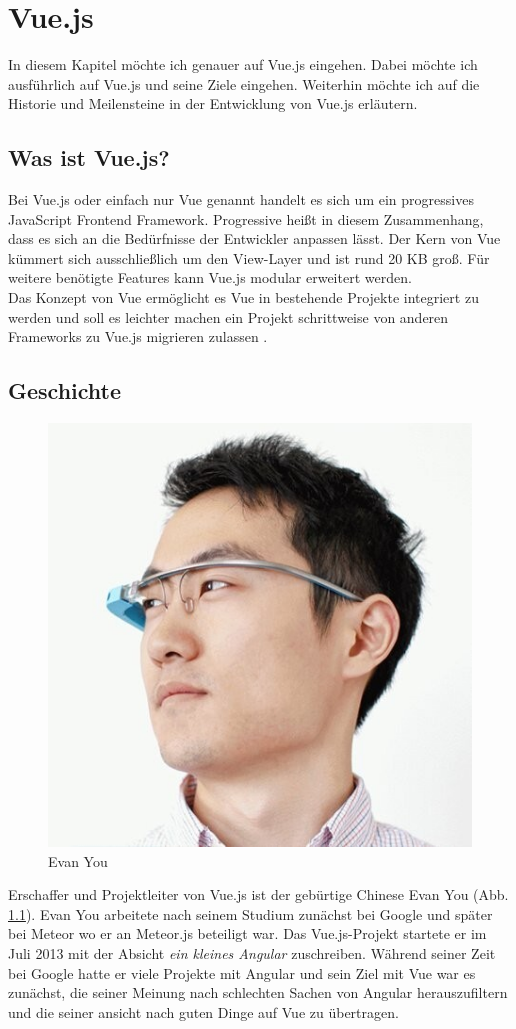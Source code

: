 
\chapter{Vue.js}
In diesem Kapitel möchte ich genauer auf Vue.js eingehen.
Dabei möchte ich ausführlich auf Vue.js und seine Ziele eingehen.
Weiterhin möchte ich auf die Historie und Meilensteine in der Entwicklung von Vue.js erläutern.


\section{Was ist Vue.js?}
Bei Vue.js oder einfach nur Vue genannt handelt es sich um ein progressives JavaScript Frontend Framework.
Progressive heißt in diesem Zusammenhang,
dass es sich an die Bedürfnisse der Entwickler anpassen lässt.
Der Kern von Vue kümmert sich ausschließlich um den View-Layer und ist rund 20 KB groß.
Für weitere benötigte Features kann Vue.js modular erweitert werden. \cite[S. 523-524]{bin2019}
\\
Das Konzept von Vue ermöglicht es Vue in bestehende Projekte integriert zu werden
und soll es leichter machen ein Projekt
schrittweise von anderen Frameworks zu Vue.js migrieren zulassen  \cite[S. 1]{peterke2019}.

\section{Geschichte}

\begin{figure}[!htb]
    \centering
    \includegraphics[width=.3\textwidth]{img/you}
    \caption{Evan You}
    \label{fig:you}
\end{figure}

Erschaffer und Projektleiter von Vue.js ist der gebürtige Chinese Evan You (Abb. \ref{fig:you}).
Evan You arbeitete nach seinem Studium zunächst bei Google und später bei Meteor wo er
an Meteor.js beteiligt war.
Das Vue.js-Projekt startete er im Juli 2013 mit der Absicht \emph{ ein kleines Angular}
zuschreiben.
Während seiner Zeit bei Google hatte er viele Projekte mit Angular und
sein Ziel mit Vue war es zunächst, die seiner Meinung nach schlechten Sachen von Angular herauszufiltern
und die seiner ansicht nach guten Dinge auf Vue zu übertragen.



